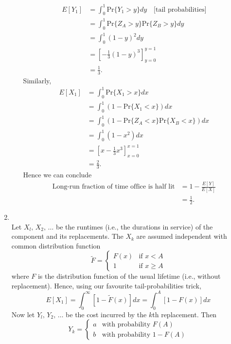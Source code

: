 \documentclass[11pt,a4paper]{article}
\begin{document}
\begin{enumerate}
\begin{enumerate}
      \begin{align*}
        E[Y_1]
        &= \int_0^1 \text{Pr}\{Y_1 > y\}dy\quad \text{[tail probabilities]}\\
        &= \int_0^1\text{Pr}\{Z_A > y\}\text{Pr}\{Z_B > y\}dy\\
        &= \int_0^1(1 - y)^2dy\\
        &= \left[-\frac{1}{3}(1 - y)^3\right]_{y = 0}^{y = 1}\\
        &= \frac{1}{3}.
      \end{align*}
      Similarly,
      \begin{align*}
        E[X_1]
        &= \int_0^1 \text{Pr}\{X_1 > x\}dx\\
        &= \int_0^1(1 - \text{Pr}\{X_1 < x\})dx\\
        &= \int_0^1(1 - \text{Pr}\{Z_A < x\}\text{Pr}\{X_B < x\})dx\\
        &= \int_0^1(1 - x^2)dx\\
        &= \left[x - \frac{1}{3}x^3\right]_{x = 0}^{x = 1}\\
        &= \frac{2}{3}.
      \end{align*}
      Hence we can conclude
      \begin{align*}
        \text{Long-run fraction of time office is half lit}
        &= 1 - \frac{E[Y]}{E[X]}\\
        &= \frac{1}{2}.
      \end{align*}
    \end{enumerate}
    \item {}\\
    Let $X_l,\, X_2,\, \ldots$ be the runtimes (i.e., the durations in service) of the component and its replacements. The $X_k$ are assumed independent with common distribution function
    $$
    \tilde{F} =
    \begin{cases}
      F(x) & \text{if $x < A$}\\
      1 & \text{if $x \geq A$}
    \end{cases}
    $$
    where $F$ is the distribution function of the usual lifetime (i.e., without replacement). Hence, using our favourite tail-probabilities trick,
    $$
    E[X_1] = \int_0^\infty[1 - \tilde{F}(x)]dx = \int_0^A[1 - F(x)]dx
    $$
    Now let $Y_l,\, Y_2,\, \ldots$ be the cost incurred by the $k$th replacement. Then
    $$
    Y_k =
    \begin{cases}
      a & \text{with probability $F(A)$}\\
      b & \text{with probability $1 - F(A)$}

\end{cases}$$
\end{enumerate}
\end{document}
